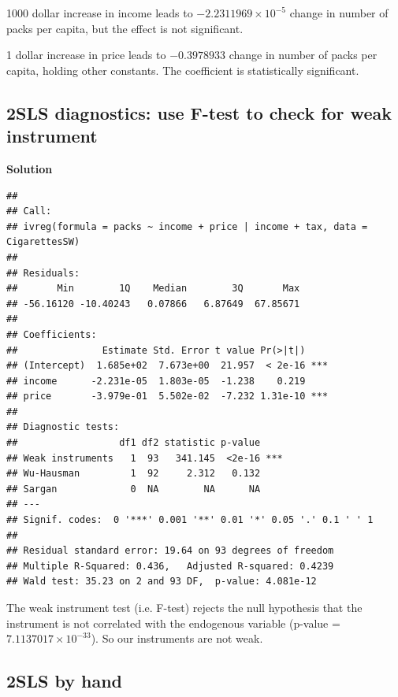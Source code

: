 \documentclass{article}
\begin{document}
1000 dollar increase in income leads to \ensuremath{-2.2311969\times 10^{-5}} change in number of packs per capita, but the effect is not significant.

1 dollar increase in price leads to \ensuremath{-0.3978933} change in number of packs per capita, holding other constants. The coefficient is statistically significant.

\subsection{2SLS diagnostics: use F-test to check for weak instrument}

\textbf{Solution}

\begin{knitrout}
\color{fgcolor}\begin{kframe}
\begin{alltt}
  \hlstd{=} \hlstd{)}
\end{alltt}
\begin{verbatim}
## 
## Call:
## ivreg(formula = packs ~ income + price | income + tax, data = CigarettesSW)
## 
## Residuals:
##       Min        1Q    Median        3Q       Max 
## -56.16120 -10.40243   0.07866   6.87649  67.85671 
## 
## Coefficients:
##               Estimate Std. Error t value Pr(>|t|)    
## (Intercept)  1.685e+02  7.673e+00  21.957  < 2e-16 ***
## income      -2.231e-05  1.803e-05  -1.238    0.219    
## price       -3.979e-01  5.502e-02  -7.232 1.31e-10 ***
## 
## Diagnostic tests:
##                  df1 df2 statistic p-value    
## Weak instruments   1  93   341.145  <2e-16 ***
## Wu-Hausman         1  92     2.312   0.132    
## Sargan             0  NA        NA      NA    
## ---
## Signif. codes:  0 '***' 0.001 '**' 0.01 '*' 0.05 '.' 0.1 ' ' 1
## 
## Residual standard error: 19.64 on 93 degrees of freedom
## Multiple R-Squared: 0.436,	Adjusted R-squared: 0.4239 
## Wald test: 35.23 on 2 and 93 DF,  p-value: 4.081e-12
\end{verbatim}
\end{kframe}
\end{knitrout}

The weak instrument test (i.e. F-test) rejects the null hypothesis that the instrument is not correlated with the endogenous variable (p-value = \ensuremath{7.1137017\times 10^{-33}}). So our instruments are not weak.

\subsection{2SLS by hand}
\end{document}
